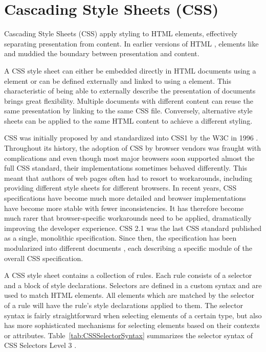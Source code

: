 \section{Cascading Style Sheets (CSS)}
\label{sec:CSS}

Cascading Style Sheets (CSS) apply styling to HTML elements,
effectively separating presentation from content. In earlier versions
of HTML \parencite{HTML32}, elements like  and
 muddied the boundary between presentation and content.

A CSS style sheet can either be embedded directly in HTML documents
using a  element or can be defined externally and
linked to using a  element. This characteristic of
being able to externally describe the presentation of documents brings
great flexibility. Multiple documents with different content can reuse
the same presentation by linking to the same CSS file. Conversely,
alternative style sheets can be applied to the same HTML content to
achieve a different styling.

CSS was initially proposed by \textcite{CSSProposal} and standardized
into CSS1 by the W3C in 1996 \parencite{CSS1}. Throughout its history,
the adoption of CSS by browser vendors was fraught with complications
and even though most major browsers soon supported almost the full CSS
standard, their implementations sometimes behaved differently. This
meant that authors of web pages often had to resort to workarounds,
including providing different style sheets for different browsers. In
recent years, CSS specifications have become much more detailed
\parencite{CSS21} and browser implementations have become more stable
with fewer inconsistencies. It has therefore become much rarer that
browser-specific workarounds need to be applied, dramatically
improving the developer experience. CSS 2.1 \parencite{CSS21} was the
last CSS standard published as a single, monolithic
specification. Since then, the specification has been modularized into
different documents \parencite{CSSSnapshot2020}, each describing a
specific module of the overall CSS specification.
 

A CSS style sheet contains a collection of rules. Each rule consists
of a selector and a block of style declarations. Selectors are defined
in a custom syntax and are used to match HTML elements.  All elements
which are matched by the selector of a rule will have the rule's style
declarations applied to them. The selector syntax is fairly
straightforward when selecting elements of a certain type, but also
has more sophisticated mechanisms for selecting elements based on
their contexts or attributes. Table~\ref{tab:CSSSelectorSyntax}
summarizes the selector syntax of CSS Selectors Level 3
\parencite{CSSSelectors3}.




